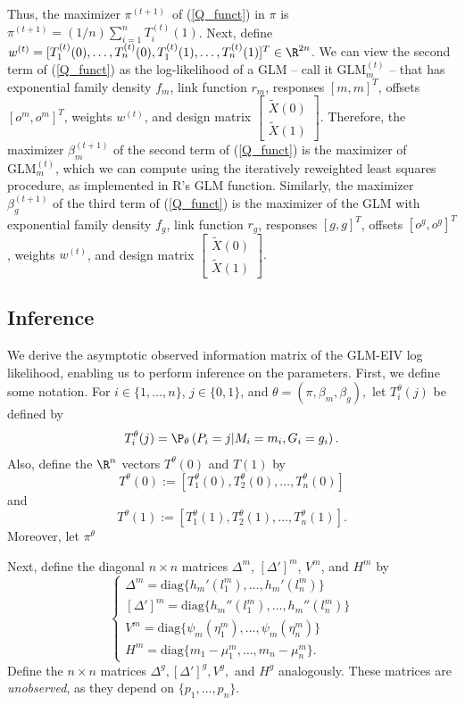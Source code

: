 \documentclass[12pt]{article}
\begin{document}
\begin{appendices}
Thus, the maximizer $\pi^{(t+1)}$ of (\ref{Q_funct}) in $\pi$ is $\pi^{(t+1)} = (1/n)\sum_{i=1}^n T^{(t)}_i(1)$. Next, define $w^{(t)} = [T^{(t)}_1(0), \dots, T^{(t)}_n(0), T^{(t)}_1(1), \dots, T^{(t)}_n(1)]^T \in \R^{2n}$. We can view the second term of (\ref{Q_funct}) as the log-likelihood of a GLM -- call it $\textrm{GLM}^{(t)}_m$ -- that has exponential family density $f_m$, link function $r_m$, responses $[m,m]^T$, offsets $[o^m, o^m]^T$, weights $w^{(t)}$, and design matrix $\begin{bmatrix} \tilde{X}(0) \\ \tilde{X}(1) \end{bmatrix}.$ Therefore, the maximizer $\beta^{(t+1)}_m$ of the second term of (\ref{Q_funct}) is the maximizer of $\textrm{GLM}^{(t)}_m$, which we can compute using the iteratively reweighted least squares procedure, as implemented in R's GLM function. Similarly, the maximizer $\beta^{(t+1)}_g$ of the third term of (\ref{Q_funct}) is the maximizer of the GLM with exponential family density $f_g$, link function $r_g$, responses $[g,g]^T$, offsets $[o^g, o^g]^T$, weights $w^{(t)}$, and design matrix $\begin{bmatrix} \tilde{X}(0) \\ \tilde{X}(1) \end{bmatrix}.$

\subsection{Inference}
We derive the asymptotic observed information matrix of the GLM-EIV log likelihood, enabling us to perform inference on the parameters. First, we define some notation. For $i \in \{1, \dots, n\}$, $j \in \{0, 1\}$, and $\theta = (\pi, \beta_m, \beta_g),$ let $T^\theta_i(j)$ be defined by
$$T^\theta_i(j) = \P_\theta\left(P_i = j | M_i = m_i, G_i = g_i\right).$$ Also, define the $\R^n$ vectors $T^\theta(0)$ and $T(1)$ by
$$T^\theta(0) := [T^\theta_1(0), T^\theta_2(0), \dots, T^\theta_n(0)]$$ and 
$$T^\theta(1) := [T^\theta_1(1), T^\theta_2(1), \dots, T^\theta_n(1)].$$ Moreover, let $\pi^\theta$ 

Next, define the diagonal $n \times n$ matrices $\Delta^m$, $[\Delta']^m$, $V^m$, and $H^m$ by
$$
\begin{cases}
	\Delta^m = \textrm{diag} \{ h_m'(l_1^m), \dots, h_m'( l_n^m ) \} \\
	[\Delta']^m = \textrm{diag} \{ h_m''(l_1^m), \dots, h_m''( l_n^m) \} \\
	V^m = \textrm{diag} \{ \psi_m( \eta^m_1), \dots, \psi_m( \eta^m_n) \} \\
	H^m = \textrm{diag} \{ m_1 - \mu_1^m, \dots, m_n - \mu_n^m\}.
\end{cases} 
$$ Define the $n \times n$ matrices $\Delta^g, [\Delta']^g, V^g,$ and $H^g$ analogously. These matrices are \textit{unobserved}, as they depend on $\{p_1, \dots, p_n\}$.


\end{appendices}
\end{document}
